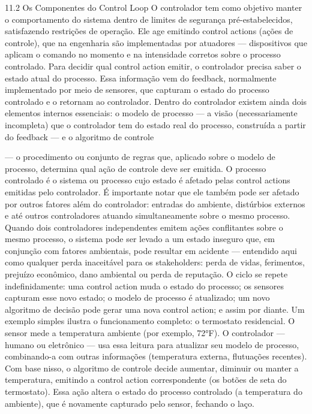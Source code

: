 11.2 Os Componentes do Control Loop O controlador tem como objetivo manter o comportamento do sistema dentro de limites de segurança pré-estabelecidos, satisfazendo restrições de operação. Ele age emitindo control actions (ações de controle), que na engenharia são implementadas por atuadores — dispositivos que aplicam o comando no momento e na intensidade corretos sobre o processo controlado. Para decidir qual control action emitir, o controlador precisa saber o estado atual do processo. Essa informação vem do feedback, normalmente implementado por meio de sensores, que capturam o estado do processo controlado e o retornam ao controlador. Dentro do controlador existem ainda dois elementos internos essenciais: o modelo de processo — a visão (necessariamente incompleta) que o controlador tem do estado real do processo, construída a partir do feedback — e o algoritmo de controle

— o procedimento ou conjunto de regras que, aplicado sobre o modelo de processo, determina qual ação de controle deve ser emitida. O processo controlado é o sistema ou processo cujo estado é afetado pelas control actions emitidas pelo controlador. É importante notar que ele também pode ser afetado por outros fatores além do controlador: entradas do ambiente, distúrbios externos e até outros controladores atuando simultaneamente sobre o mesmo processo. Quando dois controladores independentes emitem ações conflitantes sobre o mesmo processo, o sistema pode ser levado a um estado inseguro que, em conjunção com fatores ambientais, pode resultar em acidente — entendido aqui como qualquer perda inaceitável para os stakeholders: perda de vidas, ferimentos, prejuízo econômico, dano ambiental ou perda de reputação. O ciclo se repete indefinidamente: uma control action muda o estado do processo; os sensores capturam esse novo estado; o modelo de processo é atualizado; um novo algoritmo de decisão pode gerar uma nova control action; e assim por diante. Um exemplo simples ilustra o funcionamento completo: o termostato residencial. O sensor mede a temperatura ambiente (por exemplo, 72°F). O controlador — humano ou eletrônico — usa essa leitura para atualizar seu modelo de processo, combinando-a com outras informações (temperatura externa, flutuações recentes). Com base nisso, o algoritmo de controle decide aumentar, diminuir ou manter a temperatura, emitindo a control action correspondente (os botões de seta do termostato). Essa ação altera o estado do processo controlado (a temperatura do ambiente), que é novamente capturado pelo sensor, fechando o laço.

